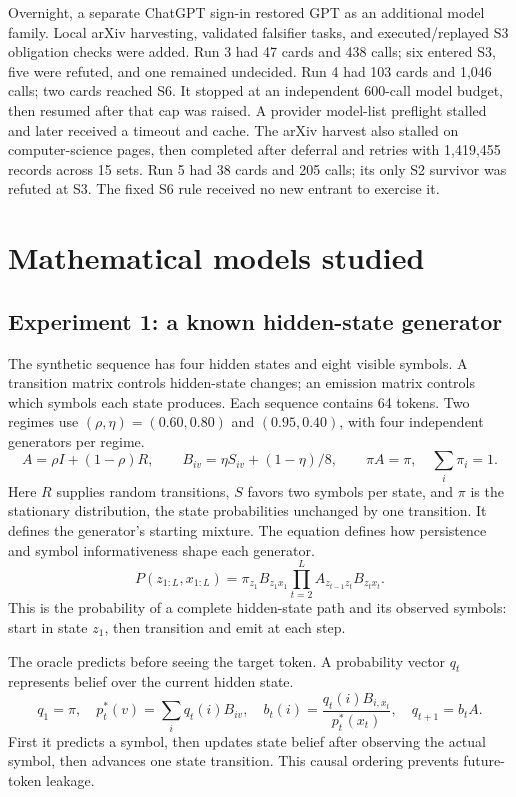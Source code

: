Overnight, a separate ChatGPT sign-in restored GPT as an additional model family. Local arXiv harvesting, validated falsifier tasks, and executed/replayed S3 obligation checks were added. Run 3 had 47 cards and 438 calls; six entered S3, five were refuted, and one remained undecided. Run 4 had 103 cards and 1,046 calls; two cards reached S6. It stopped at an independent 600-call model budget, then resumed after that cap was raised. A provider model-list preflight stalled and later received a timeout and cache. The arXiv harvest also stalled on computer-science pages, then completed after deferral and retries with 1,419,455 records across 15 sets. Run 5 had 38 cards and 205 calls; its only S2 survivor was refuted at S3. The fixed S6 rule received no new entrant to exercise it.

\section{Mathematical models studied}
\subsection{Experiment 1: a known hidden-state generator}

The synthetic sequence has four hidden states and eight visible symbols. A transition matrix controls hidden-state changes; an emission matrix controls which symbols each state produces. Each sequence contains 64 tokens. Two regimes use $(\rho,\eta)=(0.60,0.80)$ and $(0.95,0.40)$, with four independent generators per regime.
\begin{equation}
A=\rho I+(1-\rho)R,\qquad B_{iv}=\eta S_{iv}+(1-\eta)/8,\qquad \pi A=\pi,\quad \sum_i\pi_i=1.
\end{equation}
Here $R$ supplies random transitions, $S$ favors two symbols per state, and $\pi$ is the stationary distribution, the state probabilities unchanged by one transition. It defines the generator's starting mixture. The equation defines how persistence and symbol informativeness shape each generator.
\begin{equation}
P(z_{1:L},x_{1:L})=\pi_{z_1}B_{z_1x_1}\prod_{t=2}^{L}A_{z_{t-1}z_t}B_{z_tx_t}.
\end{equation}
This is the probability of a complete hidden-state path and its observed symbols: start in state $z_1$, then transition and emit at each step.

The oracle predicts before seeing the target token. A probability vector $q_t$ represents belief over the current hidden state.
\begin{equation}
q_1=\pi,\quad p_t^*(v)=\sum_iq_t(i)B_{iv},\quad b_t(i)=\frac{q_t(i)B_{i,x_t}}{p_t^*(x_t)},\quad q_{t+1}=b_tA.
\end{equation}
First it predicts a symbol, then updates state belief after observing the actual symbol, then advances one state transition. This causal ordering prevents future-token leakage.

